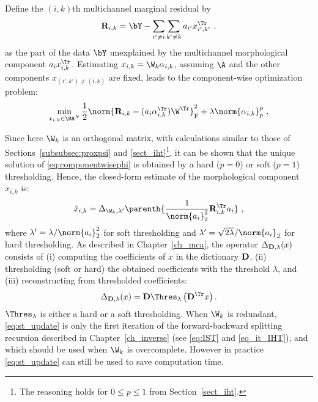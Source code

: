 Define the $(i,k)$th multichannel marginal residual by 
\begin{equation}
\label{eq:gmca_resi}
{\bf R}_{i,k} = {\bY} - \sum_{i' \neq i}   \sum_{k'\neq k}    a_{i'} x_{i',k'}^\Tr ~.
\end{equation} 
as the part of the data $\bY$ unexplained by the multichannel morphological component $a_i x_{i,k}^\Tr$. Estimating $x_{i,k} =  \W_{k}  \alpha_{i,k}$, assuming $\A$ and the other components $x_{(i',k') \neq (i,k)}$ are fixed, leads to the component-wise optimization problem:
\begin{equation}
\label{eq:componentwisephi}
\min_{x_{i,k} \in \RR^{N}} \frac{1}{2}\norm{{\bf R}_{i,k} - (a_i \alpha_{i,k}^\Tr)\W^\Tr}_{\mathrm{F}}^2 +  \lambda \norm{\alpha_{i,k}}_p^p ~ ,
\end{equation}

Since here ${\W}_k$ is an orthogonal matrix, with calculations similar to those of Sections~\ref{subsubsec:proxpsi} and \ref{sect_iht}\footnote{The reasoning holds for $0 \leq p \leq 1$ from Section~\ref{sect_iht}.}, it can be shown that the unique solution of \eqref{eq:componentwisephi} is obtained by a hard ($p=0$) or soft ($p=1$) thresholding. Hence, the closed-form estimate of the morphological component $x_{i,k}$ is: 
\begin{equation}
\label{eq:st_update}
\tilde{x}_{i,k} = \Delta_{\W_k,\lambda^\prime} \parenth{\frac{1}{\norm{a_i}_2^2} {\bf R}_{i,k}^\Tr a_i} ~,
\end{equation}
where $\lambda^\prime=\lambda/\norm{a_i}_2^2$ for soft thresholding and $\lambda^\prime=\sqrt{2\lambda}/{\norm{a_i}_2}$ for hard thresholding. As described in Chapter~\ref{ch_mca}, the operator $\Delta_{{\bf D}, \lambda}(x)$ consists of (i) computing the coefficients of $x$ in the dictionary ${\bf D}$, (ii)
thresholding (soft or hard) the obtained coefficients with the threshold $\lambda$, and (iii) reconstructing from thresholded coefficients: 
\begin{equation}
\Delta_{{\bf D},\lambda}(x) = {\bf D} \Thres_{\lambda} \left( {\bf D}^\Tr x \right).
\end{equation}
$\Thres_{\lambda}$ is either a hard or a soft thresholding. When $\W_k$ is redundant, \eqref{eq:st_update} is only the first iteration of the forward-backward splitting recursion described in Chapter~\ref{ch_inverse} (see \eqref{eq:IST} and \eqref{eq_it_IHT}), and which should be used when $\W_k$ is overcomplete.
However in practice \eqref{eq:st_update} can still be used to save computation time.

